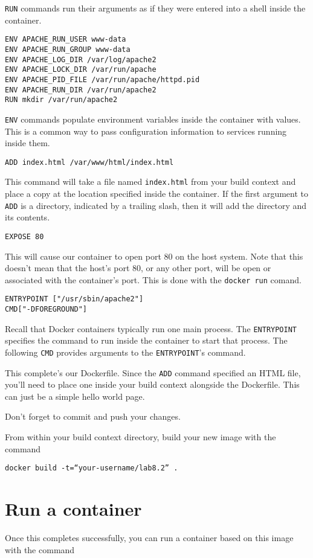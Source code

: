 \documentclass{article}
\begin{document}
\texttt{RUN} commands run their arguments as if they were entered into a shell inside the container.

\begin{verbatim}
ENV APACHE_RUN_USER www-data
ENV APACHE_RUN_GROUP www-data
ENV APACHE_LOG_DIR /var/log/apache2
ENV APACHE_LOCK_DIR /var/run/apache
ENV APACHE_PID_FILE /var/run/apache/httpd.pid
ENV APACHE_RUN_DIR /var/run/apache2
RUN mkdir /var/run/apache2
\end{verbatim}

\texttt{ENV} commands populate environment variables inside the container with values. This is a common way to pass configuration information to services running inside them.

\texttt{ADD index.html /var/www/html/index.html }

This command will take a file named \texttt{index.html} from your build context and place a copy at the location specified inside the container. If the first argument to \texttt{ADD} is a directory, indicated by a trailing slash, then it will add the directory and its contents.

\texttt{EXPOSE 80}

This will cause our container to open port 80 on the host system.  Note that this doesn't mean that the host's port 80, or any other port, will be open or associated with the container's port.  This is done with the \texttt{docker run} comand.

\begin{verbatim}
ENTRYPOINT ["/usr/sbin/apache2"]
CMD["-DFOREGROUND"]
\end{verbatim}

Recall that Docker containers typically run one main process.  The \texttt{ENTRYPOINT} specifies the command to run inside the container to start that process. The following \texttt{CMD} provides arguments to the \texttt{ENTRYPOINT}'s command.

This complete's our Dockerfile.  Since the \texttt{ADD} command specified an HTML file, you'll need to place one inside your build context alongside the Dockerfile. This can just be a simple hello world page.

Don't forget to commit and push your changes.


From within your build context directory, build your new image with the command

\texttt{docker build -t=``your-username/lab8.2'' .}


\section{Run a container}
Once this completes successfully, you can run a container based on this image with the command 
\end{document}
